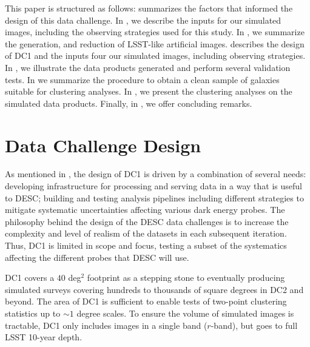 \documentclass[\docopts]{\docclass}
\begin{document}
This paper is structured as follows:  summarizes the factors that informed
the design of this data challenge.  In , we describe the inputs for our simulated images, including the observing strategies used for this study. In , we summarize the  generation, and reduction of LSST-like artificial images.  describes the design of DC1 and the inputs four our simulated images, including observing strategies. In , we illustrate the data products generated and perform several validation tests. In  we summarize the procedure to obtain a clean sample of galaxies suitable for clustering analyses. In , we present the clustering analyses on the simulated data products. Finally, in , we offer concluding remarks.

\section{Data Challenge Design}
\label{sec:design}

As mentioned in , the design of DC1 is driven by a
combination of several needs: developing infrastructure for processing and serving data in a way that is useful to DESC; building and testing analysis pipelines including different strategies to mitigate systematic uncertainties affecting various dark energy probes. The philosophy behind the design of the DESC data challenges is to increase the complexity and level
of realism of the datasets in each subsequent iteration. Thus, DC1 is limited in scope and focus, testing a subset of the systematics affecting the different probes that DESC will use.



DC1 covers a $40$ deg$^2$ footprint as a stepping stone to eventually producing simulated surveys covering hundreds to thousands of square degrees in DC2 and beyond.  The area of DC1 is sufficient to enable tests of
two-point clustering statistics up to $\sim 1$ degree scales.  To ensure the volume of simulated images is
tractable, DC1 only includes images in a single band ($r$-band), but goes to full LSST 10-year
depth. 
\end{document}
